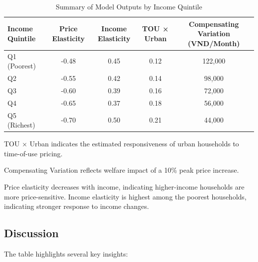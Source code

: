 \documentclass[12pt,a4paper]{article}
\begin{document}
	\begin{table}[H]
		\centering
		\begin{threeparttable}
			\caption{Summary of Model Outputs by Income Quintile}
			\label{tab:model_summary}
			\begin{tabular}{lcccc}
				\toprule
				Income Quintile & Price Elasticity & Income Elasticity & TOU × Urban & Compensating Variation (VND/Month) \\
				\midrule
				Q1 (Poorest)    & -0.48 & 0.45 & 0.12 & 122,000 \\
				Q2              & -0.55 & 0.42 & 0.14 & 98,000 \\
				Q3              & -0.60 & 0.39 & 0.16 & 72,000 \\
				Q4              & -0.65 & 0.37 & 0.18 & 56,000 \\
				Q5 (Richest)    & -0.70 & 0.50 & 0.21 & 44,000 \\
				\bottomrule
			\end{tabular}
			\begin{tablenotes}
				\small
				\item TOU × Urban indicates the estimated responsiveness of urban households to time-of-use pricing.
				\item Compensating Variation reflects welfare impact of a 10\% peak price increase.
				\item Price elasticity decreases with income, indicating higher-income households are more price-sensitive. Income elasticity is highest among the poorest households, indicating stronger response to income changes.
			\end{tablenotes}
		\end{threeparttable}
	\end{table}
		
	\subsection{Discussion}
	
	The table highlights several key insights:
	
\end{document}
